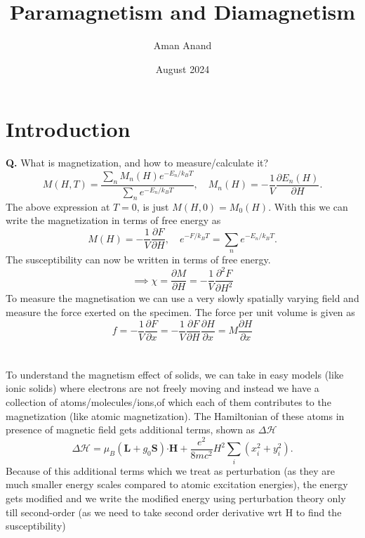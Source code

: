 \documentclass{article}
\title{Paramagnetism and Diamagnetism}
\author{Aman Anand}
\date{August 2024}
\begin{document}
	
	\maketitle
	
	\section{Introduction}
	\textbf{Q.} What is magnetization, and how to measure/calculate it? \\
	\begin{equation}
	M(H,T) = \frac{\sum_n M_n (H) e^{-E_n/k_BT}}{\sum_ne^{-E_n/k_BT}}, \quad M_n(H) = -\frac{1}{V}\frac{\partial E_n(H)}{\partial H}.
	\end{equation}
	The above expression at $T = 0$, is just $M(H,0) = M_0 (H)$.
	With this we can write the magnetization in terms of free energy as
	\begin{equation}
	M(H) = -\frac{1}{V}\frac{\partial F}{\partial H}, \quad e^{-F/k_BT} = \sum_ne^{-E_n/k_BT}.
	\end{equation}
	The susceptibility can now be written in terms of free energy.
	\begin{equation}
	\implies \chi = \frac{\partial M}{\partial H} = -\frac{1}{V}\frac{\partial^2 F}{\partial H^2}
	\end{equation}
	To measure the magnetisation we can use a very slowly spatially varying field and measure the force exerted on the specimen. The force per unit volume is given as
	\begin{equation}
	f = -\frac{1}{V}\frac{\partial F}{\partial x} = -\frac{1}{V}\frac{\partial F}{\partial H} \frac{\partial H}{\partial x} = M \frac{\partial H}{\partial x} 
	\end{equation}
\\\\
	To understand the magnetism effect of solids, we can take in easy models (like ionic solids) where electrons are not freely moving and instead we have a collection of atoms/molecules/ions,of which each of them contributes to the magnetization (like atomic magnetization). The Hamiltonian of these atoms in presence of magnetic field gets additional terms, shown as $\Delta \mathcal{H}$
\begin{equation}
\Delta \mathcal{H} = \mu_B (\mathbf{L}+ g_0 \mathbf{S})\mathbf{ \cdot} \mathbf{H} + \frac{e^2}{8mc^2} H^2 \sum_i (x_i ^2 + y_i ^2).
\end{equation}
Because of this additional terms which we treat as perturbation (as they are much smaller energy scales compared to atomic excitation energies), the energy gets modified and we write the modified energy using perturbation theory only till second-order (as we need to take second order derivative wrt H to find the susceptibility)
\end{document}
